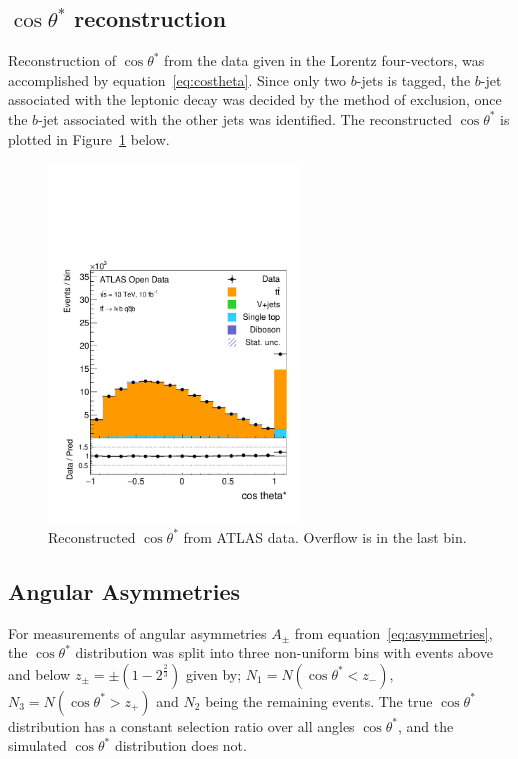 \documentclass[12pt,a4paper]{article}
\numberwithin{equation}{section}
\begin{document}
\subsection{$\cos \theta^{*}$ reconstruction}
Reconstruction of $\cos \theta^{*}$ from the data given in the Lorentz four-vectors, was
accomplished by equation~\eqref{eq:costheta}. Since only two $b$-jets is tagged,
the $b$-jet associated with the leptonic decay was decided by the method of
exclusion, once the $b$-jet associated with the other jets was identified. The
reconstructed $\cos \theta^{*}$ is plotted in Figure~\ref{fig:costhetaatlas} below.
\begin{figure}[H]
  \centering
  \includegraphics[width=0.6\textwidth]{figures/hist_costheta_overflow}
  \caption{\label{fig:costhetaatlas}Reconstructed $\cos \theta^{*}$ from ATLAS data. Overflow is in the last bin.}
\end{figure}

\subsection{Angular Asymmetries}
For measurements of angular asymmetries $A_{\pm}$ from
equation~\eqref{eq:asymmetries}, the $\cos\theta^{*}$ distribution was split into
three non-uniform bins with events above and below
$z_{\pm} = \pm(1-2^{\frac{2}{3}})$ given by; $N_1 = N(\cos \theta^{*}<z_-)$,
$N_3 = N(\cos \theta^{*}>z_+)$ and $N_2$ being the remaining events. The true
$\cos\theta^*$ distribution has a constant selection ratio over all angles $\cos\theta^*$,
and the simulated $\cos\theta^*$ distribution does
not.\\
\end{document}
